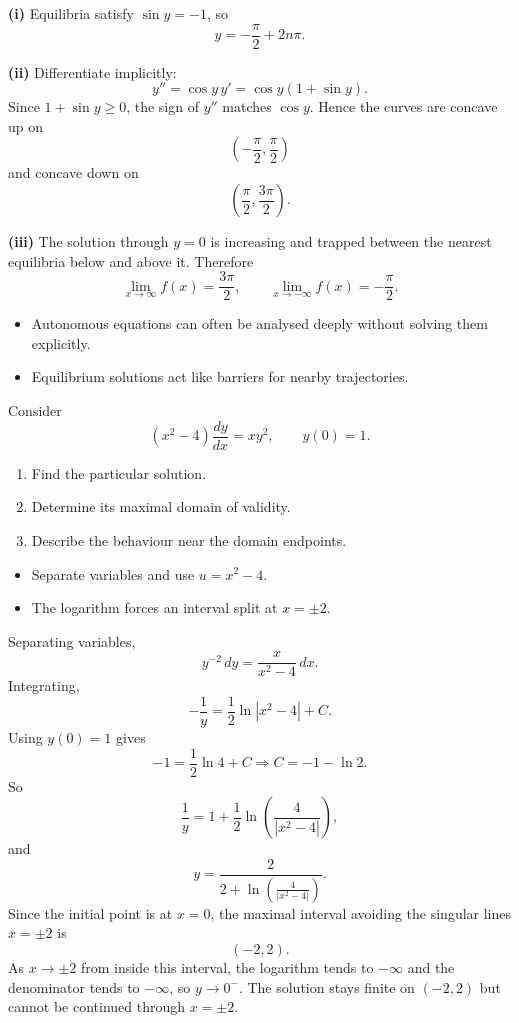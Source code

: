 \begin{solution}
\textbf{(i)} Equilibria satisfy $\sin y=-1$, so
\[
\boxed{y=-\frac{\pi}{2}+2n\pi}.
\]

\textbf{(ii)} Differentiate implicitly:
\[
y''=\cos y\,y'=\cos y(1+\sin y).
\]
Since $1+\sin y\ge0$, the sign of $y''$ matches $\cos y$. Hence the curves are concave up on
\[
\left(-\frac{\pi}{2},\frac{\pi}{2}\right)
\]
and concave down on
\[
\left(\frac{\pi}{2},\frac{3\pi}{2}\right).
\]

\textbf{(iii)} The solution through $y=0$ is increasing and trapped between the nearest equilibria below and above it. Therefore
\[
\boxed{\lim_{x\to\infty}f(x)=\frac{3\pi}{2},\qquad \lim_{x\to-\infty}f(x)=-\frac{\pi}{2}.}
\]
\end{solution}

\begin{takeaways}
\begin{itemize}[leftmargin=*]
    \item Autonomous equations can often be analysed deeply without solving them explicitly.
    \item Equilibrium solutions act like barriers for nearby trajectories.
\end{itemize}
\end{takeaways}

\begin{problem}
Consider
\[
(x^2-4)\frac{dy}{dx}=xy^2,\qquad y(0)=1.
\]
\begin{enumerate}
    \item[\textbf{i}] Find the particular solution.
    \item[\textbf{ii}] Determine its maximal domain of validity.
    \item[\textbf{iii}] Describe the behaviour near the domain endpoints.
\end{enumerate}
\end{problem}

\begin{hint}
\begin{itemize}[leftmargin=*]
    \item Separate variables and use $u=x^2-4$.
    \item The logarithm forces an interval split at $x=\pm2$.
\end{itemize}
\end{hint}

\begin{solution}
Separating variables,
\[
y^{-2}\,dy=\frac{x}{x^2-4}\,dx.
\]
Integrating,
\[
-\frac1y=\frac12\ln|x^2-4|+C.
\]
Using $y(0)=1$ gives
\[
-1=\frac12\ln4+C \Rightarrow C=-1-\ln2.
\]
So
\[
\frac1y=1+\frac12\ln\left(\frac{4}{|x^2-4|}\right),
\]
and
\[
\boxed{y=\frac{2}{2+\ln\!\left(\frac{4}{|x^2-4|}\right)}}.
\]
Since the initial point is at $x=0$, the maximal interval avoiding the singular lines $x=\pm2$ is
\[
\boxed{(-2,2)}.
\]
As $x\to\pm2$ from inside this interval, the logarithm tends to $-\infty$ and the denominator tends to $-\infty$, so $y\to0^-$. The solution stays finite on $(-2,2)$ but cannot be continued through $x=\pm2$.
\end{solution}

